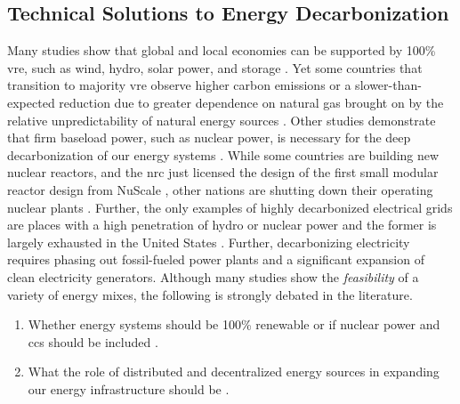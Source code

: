 \subsection{Technical Solutions to Energy Decarbonization}

Many studies show that global and local economies can be supported by 100\%
\ac{vre}, such as wind, hydro, solar power, and storage \cite{jacobson_100_2015,
bussar_optimal_2014,brown_response_2018,dorotic_integration_2019,wallsgrove_emerging_2021,
cochran_la100_2021,cosic_100_2012,traber_economically_2021,bogdanov_full_2021,
bogdanov_north-east_2016,
esteban_100_2018,yue_least_2020,neumann_near-optimal_2021}. Yet some countries
that transition to majority \ac{vre} observe higher carbon emissions or a
slower-than-expected reduction due to greater dependence on natural gas brought
on by the relative unpredictability of natural energy sources
\cite{wagner_co2_2021}. Other studies demonstrate that firm baseload power, such
as nuclear power, is necessary for the deep decarbonization of our energy
systems
\cite{wagner_co2_2021,shaner_geophysical_2018,dotson_influence_2022,greene_enhancing_2019,kim_carbon_2021,
lehtveer_how_2015,vaillancourt_role_2008,
de_sisternes_value_2016,alzbutas_uncertainty_2012,brook_why_2014,
epiney_economic_2020,petti_future_2018, patrizio_socially_2020}. While some
countries are building new nuclear reactors, and the \ac{nrc} just licensed the
design of the first small modular reactor design from NuScale
\cite{office_of_nuclear_energy_science_and_technology_nrc_2023}, other nations
are shutting down their operating nuclear plants \cite{johnson_new_2021}. 
Further, the only examples of highly decarbonized electrical grids are places
with a high penetration of hydro or nuclear power and the former is largely
exhausted in the United States \cite{lopez_us_2012}. Further, decarbonizing
electricity requires phasing out fossil-fueled power plants and a significant
expansion of clean electricity generators. Although many studies show the
\textit{feasibility} of a variety of energy mixes, the following is strongly
debated in the literature.
\begin{enumerate}
    \item Whether energy systems should be 100\% renewable or if nuclear power
    and \ac{ccs} should be included \cite{heard_burden_2017,
    brown_response_2018,elmallah_frontlining_2022, brook_why_2014}.
    \item What the role of distributed and decentralized energy sources in
    expanding our energy infrastructure should be
    \cite{pitt_assessing_2015,rinaldi_what_2022,parag_electricity_2016,wang_modeling_2020,
    morvaj_decarbonizing_2017,gilbert_can_2020,li_economic_2016,falke_multi-objective_2016}.
\end{enumerate}
